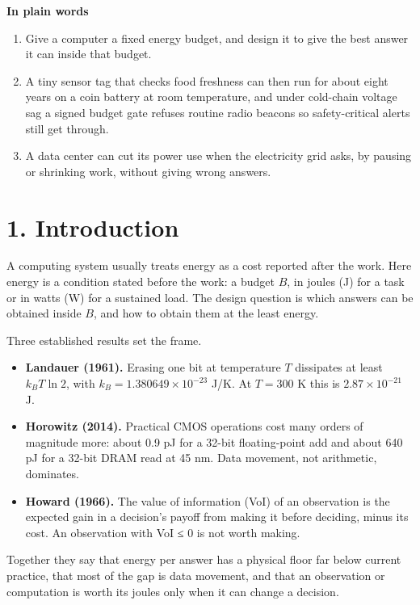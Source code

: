 \documentclass[10pt,letterpaper]{article}
\providecommand{\tightlist}{\setlength{\itemsep}{1pt}\setlength{\parskip}{0pt}}
\begin{document}
\textbf{In plain words}

\begin{enumerate}
\def\labelenumi{\arabic{enumi}.}
\tightlist
\item
  Give a computer a fixed energy budget, and design it to give the best
  answer it can inside that budget.
\item
  A tiny sensor tag that checks food freshness can then run for about
  eight years on a coin battery at room temperature, and under
  cold-chain voltage sag a signed budget gate refuses routine radio
  beacons so safety-critical alerts still get through.
\item
  A data center can cut its power use when the electricity grid asks, by
  pausing or shrinking work, without giving wrong answers.
\end{enumerate}

\section{1. Introduction}\label{introduction}

A computing system usually treats energy as a cost reported after the
work. Here energy is a condition stated before the work: a budget \(B\),
in joules (J) for a task or in watts (W) for a sustained load. The
design question is which answers can be obtained inside \(B\), and how
to obtain them at the least energy.

Three established results set the frame.

\begin{itemize}
\tightlist
\item
  \textbf{Landauer (1961).} Erasing one bit at temperature \(T\)
  dissipates at least \(k_B T \ln 2\), with
  \(k_B = 1.380649 \times 10^{-23}\) J/K. At \(T = 300\) K this is
  \(2.87 \times 10^{-21}\) J.
\item
  \textbf{Horowitz (2014).} Practical CMOS operations cost many orders
  of magnitude more: about 0.9 pJ for a 32-bit floating-point add and
  about 640 pJ for a 32-bit DRAM read at 45 nm. Data movement, not
  arithmetic, dominates.
\item
  \textbf{Howard (1966).} The value of information (VoI) of an
  observation is the expected gain in a decision's payoff from making it
  before deciding, minus its cost. An observation with VoI ≤ 0 is not
  worth making.
\end{itemize}

Together they say that energy per answer has a physical floor far below
current practice, that most of the gap is data movement, and that an
observation or computation is worth its joules only when it can change a
decision.
\end{document}
